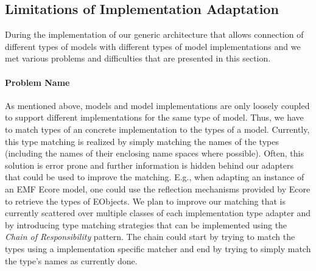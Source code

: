 \subsection{Limitations of Implementation Adaptation}
	 During the implementation of our
	generic architecture that allows connection of different types of models 
	with different types of model implementations and  we met various problems and
	difficulties that are presented in this section. 

	\paragraph{Problem Name}
	As mentioned above, models and model implementations are only loosely 
	coupled to support different implementations for the same type of model.
	 Thus, we have to match types of an concrete implementation to
	the types of a model. Currently, this type matching is realized by simply 
	matching the names of the types (including the names of 
	their enclosing name spaces where possible). Often, this solution is error 
	prone and further information is hidden behind our adapters that could be 
	used to improve the matching. E.g., when adapting an instance of an EMF 
	Ecore model, one could use the reflection mechanisms provided by Ecore to
	retrieve the types of EObjects. We plan to improve our matching
	that is currently scattered over multiple classes of each implementation type 
	adapter and by introducing type matching strategies that 
	can be implemented using the \textit{Chain of Responsibility} 
	pattern\cite{gamma:dp}. The chain could start by trying to match the 
	types using a implementation specific matcher and end by trying to 
	simply match the type's names as currently done.
	
